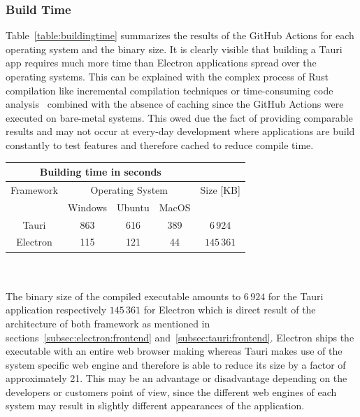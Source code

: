 \subsubsection{Build Time}
\label{subsubsec:perf:buildtime}
Table~\ref{table:buildingtime} summarizes the results of the GitHub Actions for each operating system and the binary size.
It is clearly visible that building a Tauri app requires much more time than Electron applications spread over the operating systems.
This can be explained with the complex process of Rust compilation like incremental compilation techniques or time-consuming code analysis~\cite{rustCompileTime} combined with the absence
of caching since the GitHub Actions were executed on bare-metal systems.
This owed due the fact of providing comparable results and may not occur at every-day development where applications are build constantly to test features and therefore cached to reduce compile time.
\\
\begin{tabular} {| c | c | c | c | c |}
    \hline
    \multicolumn{4}{|c|}{Building time in seconds} & \\ \hline
    Framework & \multicolumn{3}{|c|}{Operating System} & Size [KB]  \\ \hline
    & Windows & Ubuntu & MacOS &  \\ \hline
    Tauri & 863 & 616 & 389 & $6\,924$  \\ \hline
    Electron & 115 & 121 & 44 & $145\,361$ \\ \hline
\end{tabular}
\label{table:buildingtime}
\\ \\

The binary size of the compiled executable amounts to $6\,924$ for the Tauri application respectively $145\,361$ for Electron which is direct result of the architecture of both framework as mentioned in sections~\ref{subsec:electron:frontend} and~\ref{subsec:tauri:frontend}.
Electron ships the executable with an entire web browser making whereas Tauri makes use of the system specific web engine and therefore is able to reduce its size by a factor of approximately 21.
This may be an advantage or disadvantage depending on the developers or customers point of view, since the different web engines of each system may result in slightly different appearances of the application.


